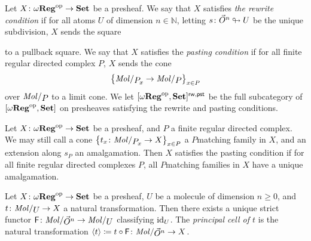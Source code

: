 \begin{dfn}  \label{dfn:rewrite_condition}
    Let \( X \colon \omega\mathbf{Reg}^\mathrm{op} \to \mathbf{Set} \) be a presheaf. 
    We say that \( X \) satisfies \emph{the rewrite condition} if for all atoms \( U \) of dimension \( n \in \mathbb{N} \), letting \( s \colon \vec{O}^{n} \looparrowright U \) be the unique subdivision, \( X \) sends the square
    \begin{center}
    \end{center}
    to a pullback square.
    We say that \( X \) satisfies the \emph{pasting condition} if for all finite regular directed complex \( P \), \( X \) sends the cone 
    \begin{equation*}
        \set{\molecin{\imel{P}{x}} \to \molecin{P}}_{x \in P}
    \end{equation*}
    over \( \molecin{P} \) to a limit cone.
    We let \( [\omega\mathbf{Reg}^\mathrm{op}, \mathbf{Set}]^{\mathsf{rw, pst}} \) be the full subcategory of \( [\omega\mathbf{Reg}^\mathrm{op}, \mathbf{Set}] \) on presheaves satisfying the rewrite and pasting conditions.
\end{dfn}

\begin{rmk}
    Let \( X \colon \omega\mathbf{Reg}^\mathrm{op} \to \mathbf{Set} \) be a presheaf, and \( P \) a finite regular directed complex. 
    We may still call a cone \( \set{t_x \colon \molecin{\imel{P}{x}} \to X}_{x \in P} \) a \( P \)\nbd matching family in \( X \), and an extension along \( s_P \) an amalgamation.
    Then \( X \) satisfies the pasting condition if for all finite regular directed complexes \( P \), all \( P \)\nbd matching families in \( X \) have a unique amalgamation.
\end{rmk}

\begin{dfn}
    Let \( X \colon \omega\mathbf{Reg}^\mathrm{op} \to \mathbf{Set} \) be a presheaf, \( U \) be a molecule of dimension \( n \geq 0 \), and \( t \colon \molecin{U} \to X \) a natural transformation.
    Then there exists a unique strict functor \( \F \colon \molecin{\dglobe{n}} \to \molecin{U} \) classifying \( \mathrm{id}_{U} \).
    The \emph{principal cell of \( t \)} is the natural transformation \( \pcell{t} \eqdef t \after \F \colon \molecin{\dglobe{n}} \to X \).
\end{dfn}

